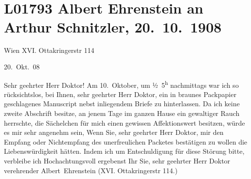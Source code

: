 

\section[Albert Ehrenstein an Arthur Schnitzler, 20. 10. 1908]{L01793 Albert Ehrenstein an Arthur Schnitzler, 20. 10. 1908}
\nopagebreak{}
\rehead{ }\normalsize\beginnumbering{}
\toendnotes[C]{\smallbreak\pagebreak[2]}
\toendnotes[C]{\smallbreak}
\pstart
           
\pstart
           {\pb}Wien XVI. Ottakringerstr 114\pend
           
\pstart
           \raggedleft{}20. Okt. 08\pend
           \pend
           
\pstart{}Sehr geehrter Herr Doktor! \pend\vspace{0.5em}
\pstart
           Am 10. Oktober, um ½ 5\textsuperscript{h} nachmittags war ich so rücksichtslos, bei Ihnen, sehr geehrter Herr Doktor,
               ein in braunes Packpapier geschlagenes Manuscript nebst inliegendem Briefe zu hinterlassen. Da ich
               keine zweite Abschrift besitze, an jenem Tage im ganzen Hause ein gewaltiger Rauch
               herrschte, die Sächelchen für mich einen gewissen Affektionswert besitzen, würde es
               mir sehr angenehm sein, Wenn Sie, sehr geehrter Herr
               Doktor, {\pb}mir den Empfang oder Nichtempfang
               des unerfreulichen Packetes bestätigen zu wollen die Liebenswürdigkeit hätten. Indem
               ich um Entschuldigung für diese Störung bitte, verbleibe ich Hochachtungsvoll
               ergebenst Ihr Sie, sehr geehrter Herr Doktor verehrender\pend
           \pstart \spacefill\mbox{Albert Ehrenstein}\pend{}
\pstart
           \noindent{}(XVI. Ottakringerstr 114.)\pend
           \endnumbering{}  
      